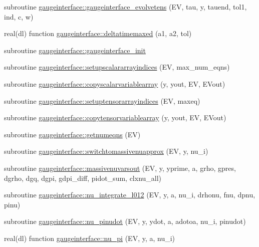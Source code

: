 \begin{DoxyCompactItemize}
\item 
subroutine \mbox{\hyperlink{namespacegaugeinterface_a048447959e15ae6dd9e887a61e135d0c}{gaugeinterface\+::gaugeinterface\+\_\+evolvetens}} (EV, tau, y, tauend, tol1, ind, c, w)
\item 
real(dl) function \mbox{\hyperlink{namespacegaugeinterface_aaf1e4804f8b140406e78f53f199433fa}{gaugeinterface\+::deltatimemaxed}} (a1, a2, tol)
\item 
subroutine \mbox{\hyperlink{namespacegaugeinterface_a59182efb978c657918dd88675b2ab0ef}{gaugeinterface\+::gaugeinterface\+\_\+init}}
\item 
subroutine \mbox{\hyperlink{namespacegaugeinterface_a50a72debb65475527ccc7e76af616083}{gaugeinterface\+::setupscalararrayindices}} (EV, max\+\_\+num\+\_\+eqns)
\item 
subroutine \mbox{\hyperlink{namespacegaugeinterface_a8565dc876beb9e4339c005a72333f31f}{gaugeinterface\+::copyscalarvariablearray}} (y, yout, EV, E\+Vout)
\item 
subroutine \mbox{\hyperlink{namespacegaugeinterface_a21f6d1e93445d43fc8247f57dce52716}{gaugeinterface\+::setuptensorarrayindices}} (EV, maxeq)
\item 
subroutine \mbox{\hyperlink{namespacegaugeinterface_ab306d2378bd6f559471a11afc145621c}{gaugeinterface\+::copytensorvariablearray}} (y, yout, EV, E\+Vout)
\item 
subroutine \mbox{\hyperlink{namespacegaugeinterface_ad273d68dadb4d4fcc10422fed213ca25}{gaugeinterface\+::getnumeqns}} (EV)
\item 
subroutine \mbox{\hyperlink{namespacegaugeinterface_ac7f67b6e2bc871b4eb1a6d3453f796a3}{gaugeinterface\+::switchtomassivenuapprox}} (EV, y, nu\+\_\+i)
\item 
subroutine \mbox{\hyperlink{namespacegaugeinterface_ac756539212eaeba8021159b26d1d2881}{gaugeinterface\+::massivenuvarsout}} (EV, y, yprime, a, grho, gpres, dgrho, dgq, dgpi, gdpi\+\_\+diff, pidot\+\_\+sum, clxnu\+\_\+all)
\item 
subroutine \mbox{\hyperlink{namespacegaugeinterface_aaf5da349a1adc87f4c62f51f1e0c0371}{gaugeinterface\+::nu\+\_\+integrate\+\_\+l012}} (EV, y, a, nu\+\_\+i, drhonu, fnu, dpnu, pinu)
\item 
subroutine \mbox{\hyperlink{namespacegaugeinterface_acba44d8f8f824999640418908be29b9b}{gaugeinterface\+::nu\+\_\+pinudot}} (EV, y, ydot, a, adotoa, nu\+\_\+i, pinudot)
\item 
real(dl) function \mbox{\hyperlink{namespacegaugeinterface_a33373e2888fd46e2c443d7e8c2785639}{gaugeinterface\+::nu\+\_\+pi}} (EV, y, a, nu\+\_\+i)

\end{DoxyCompactItemize}
